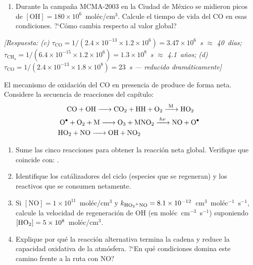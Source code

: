 \begin{bloque_ejercicios}
\begin{ejercicios}
\begin{enumerate}[label=\alph*)]
    \item Durante la campa\~na MCMA-2003 en la Ciudad de M\'exico
          se midieron picos de $[\mathrm{OH}] = 180\times10^6$~mol\'ec/cm$^3$.
          Calcule el tiempo de vida del CO en esas condiciones.
          ?`C\'omo cambia respecto al valor global?
\end{enumerate}

\textit{[Respuesta:
(c) $\tau_{\mathrm{CO}} = 1/(2.4\times10^{-13}
    \times 1.2\times10^6) = 3.47\times10^6$~s $\approx$ 40~d\'ias;
    $\tau_{\mathrm{CH_4}} = 1/(6.4\times10^{-15}
    \times 1.2\times10^6) = 1.3\times10^8$~s $\approx$ 4.1~a\~nos;
(d) $\tau_{\mathrm{CO}} = 1/(2.4\times10^{-13}
    \times 1.8\times10^8) = 23$~s --- reducido dram\'aticamente]}

\item El mecanismo de oxidaci\'on del CO en presencia de 
produce  de forma neta. Considere la secuencia de reacciones
del cap\'itulo:
\begin{eqnarray*}
    \ce{CO + OH -> CO2 + H} &
    \ce{H + O2 ->[M] HO2} \\
     \ce{O^. + O2 + M -> O3 + M}&
    \ce{NO2 ->[$h\nu$] NO + O^.}\\
    \ce{HO2 + NO -> OH + NO2}
\end{eqnarray*}

\begin{enumerate}[label=\alph*)]
    \item Sume las cinco reacciones para obtener la reacci\'on neta
          global. Verifique que coincide con:
          .

    \item Identifique los cat\'alizadores del ciclo (especies
          que se regeneran) y los reactivos que se consumen neta\-mente.

    \item Si $[\mathrm{NO}] = 1\times10^{11}$~mol\'ec/cm$^3$
          y $k_{\ce{HO2+NO}} = 8.1\times10^{-12}$~cm$^3$~mol\'ec$^{-1}$~s$^{-1}$,
          calcule la velocidad de regeneraci\'on de OH (en
          mol\'ec~cm$^{-3}$~s$^{-1}$) suponiendo
          $[\ce{HO2}] = 5\times10^8$~mol\'ec/cm$^3$.

    \item Explique por qu\'e la reacci\'on alternativa
           termina la cadena y
          reduce la capacidad oxidativa de la atm\'osfera.
          ?`En qu\'e condiciones domina este camino frente
          a la ruta con NO?
\end{enumerate}


\end{ejercicios}
\end{bloque_ejercicios}
